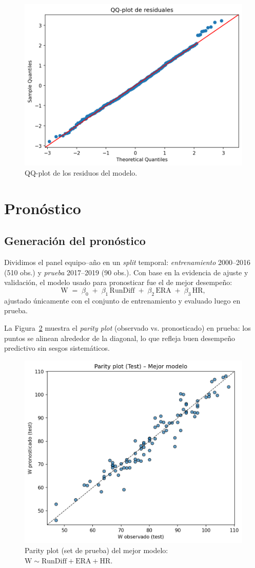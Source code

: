 \documentclass[man,floatsintext]{apa7}
\begin{document}
\begin{figure}[H]
    \centering
    \includegraphics[width=.55\linewidth]{../plots/final_version/ols_residuals_qq.png}
    \caption{QQ-plot de los residuos del modelo.}
    \label{fig:qqplot}
\end{figure}
\section{Pronóstico}
\subsection{Generación del pronóstico}
Dividimos el panel equipo–año en un \textit{split} temporal: \emph{entrenamiento} 2000--2016 (510 obs.) y \emph{prueba} 2017--2019 (90 obs.). Con base en la evidencia de ajuste y validación, el modelo usado para pronosticar fue el de mejor desempeño:
\[
\text{W} \;=\; \beta_0 \;+\; \beta_1\,\text{RunDiff} \;+\; \beta_2\,\text{ERA} \;+\; \beta_3\,\text{HR},
\]
ajustado únicamente con el conjunto de entrenamiento y evaluado luego en prueba.

La Figura~\ref{fig:parity_test_best} muestra el \textit{parity plot} (observado vs. pronosticado) en prueba: los puntos se alinean alrededor de la diagonal, lo que refleja buen desempeño predictivo sin sesgos sistemáticos.

\begin{figure}[H]
    \centering
    \includegraphics[width=0.6\linewidth]{../plots/forecast_parity_test_best.png}
    \caption{Parity plot (set de prueba) del mejor modelo: $ \text{W} \sim \text{RunDiff} + \text{ERA} + \text{HR} $.}
    \label{fig:parity_test_best}
\end{figure}
\end{document}
